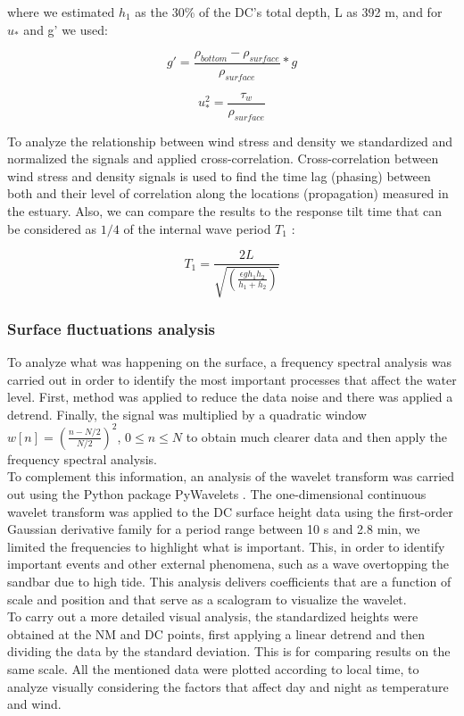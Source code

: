 \documentclass[tesis.tex]{subfiles}
\begin{document}
where we estimated $h_1$ as the 30\% of the DC's total depth, L as 392 m, and for $u_*$ and g' we used:

\begin{equation}
    g'=\frac{\rho_{bottom}-\rho_{surface}}{\rho_{surface}}*g
    \label{eq: redg}
\end{equation}

\begin{equation}
    u_*^2=\frac{\tau_w}{\rho_{surface}}
    \label{eq: ustar}
\end{equation}


To analyze the relationship between wind stress and density we standardized and normalized the signals and applied cross-correlation. Cross-correlation between wind stress and density signals is used to find the time lag (phasing) between both and their level of correlation along the locations (propagation) measured in the estuary. Also, we can compare the results to the response tilt time that can be considered as $1/4$ of the internal wave period $T_1$ \citep{stevens1996initial}: 

\begin{equation}
    T_1=\frac{2L}{\sqrt{(\frac{\epsilon g h_1 h_2}{h_1 + h_2})}}
    \label{eq: period}
\end{equation}

\subsubsection{Surface fluctuations analysis}

To analyze what was happening on the surface, a frequency spectral analysis was carried out in order to identify the most important processes that affect the water level. First, \cite{welch1967use} method was applied to reduce the data noise and there was applied a detrend. Finally, the signal was multiplied by a quadratic window $w[n]=\left( \frac{n-N/2}{N/2} \right)^2$, $0 \leq n \leq N$ to obtain much clearer data and then apply the frequency spectral analysis. \\

To complement this information, an analysis of the wavelet transform was carried out using the Python package PyWavelets \citep{lee2019pywavelets}. The one-dimensional continuous wavelet transform was applied to the DC surface height data using the first-order Gaussian derivative family for a period range between 10 s and 2.8 min, we limited the frequencies to highlight what is important. This, in order to identify important events and other external phenomena, such as a wave overtopping the sandbar due to high tide. This analysis delivers coefficients that are a function of scale and position and that serve as a scalogram to visualize the wavelet.\\

To carry out a more detailed visual analysis, the standardized heights were obtained at the NM and DC points, first applying a linear detrend and then dividing the data by the standard deviation. This is for comparing results on the same scale. All the mentioned data were plotted according to local time, to analyze visually considering the factors that affect day and night as temperature and wind.
\end{document}
